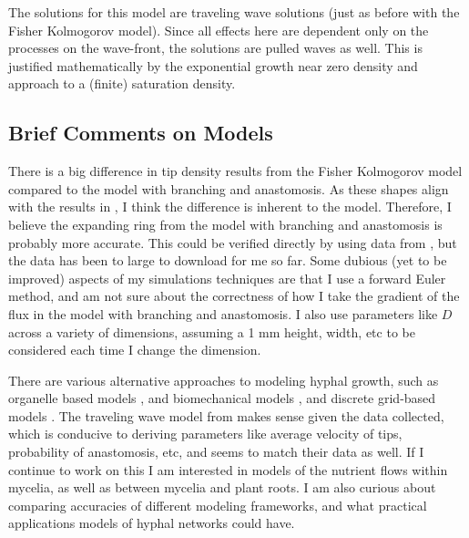\documentclass{article}
\begin{document}
The solutions for this model are traveling wave solutions (just as before with the Fisher Kolmogorov model). Since all effects here are dependent only on the processes on the wave-front, the solutions are pulled waves as well. This is justified mathematically by the exponential growth near zero density and approach to a (finite) saturation density.

\subsection{Brief Comments on Models}
There is a big difference in tip density results from the Fisher Kolmogorov model compared to the model with branching and anastomosis. As these shapes align with the results in \cite{Oyarte2025travelling}, I think the difference is inherent to the model. Therefore, I believe the expanding ring from the model with branching and anastomosis is probably more accurate. This could be verified directly by using data from \cite{Oyarte2025travelling}, but the data has been to large to download for me so far. Some dubious (yet to be improved) aspects of my simulations techniques are that I use a forward Euler method, and am not sure about the correctness of how I take the gradient of the flux in the model with branching and anastomosis. I also use parameters like $D$ across a variety of dimensions, assuming a 1 mm height, width, etc to be considered each time I change the dimension.

There are various alternative approaches to modeling hyphal growth, such as organelle based models \cite{King2015framework}, and biomechanical models \cite{GORIELY2003211}, and discrete grid-based models \cite{Boswell2006Development}. The traveling wave model from \cite{Oyarte2025travelling} makes sense given the data collected, which is conducive to deriving parameters like average velocity of tips, probability of anastomosis, etc, and seems to match their data as well. If I continue to work on this I am interested in models of the nutrient flows within mycelia, as well as between mycelia and plant roots. I am also curious about comparing accuracies of different modeling frameworks, and what practical applications models of hyphal networks could have. 

\end{document}
